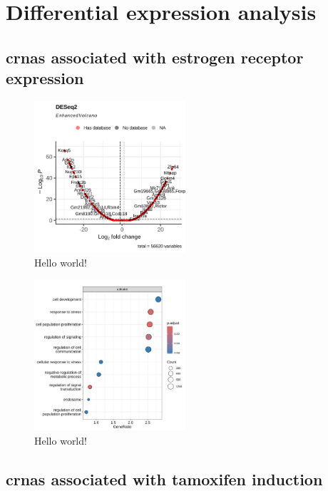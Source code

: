 \section{Differential expression analysis}

\subsection{\Glspl{crna} associated with estrogen receptor expression}

\begin{figure}[H]
    \centering

    \includegraphics[width=0.5\textwidth]{chapters/4_results_and_discussion/figures/dea/deseq2/esr1/volcano.png}
    \caption{Hello world!
    }
    \label{fig:esr1_volcano}
\end{figure}

\begin{figure}[H]
    \centering

    \includegraphics[width=0.5\textwidth]{chapters/4_results_and_discussion/figures/dea/deseq2/esr1/dot.png}
    \caption{Hello world!
    }
    \label{fig:go_terms}
\end{figure}

\subsection{\Glspl{crna} associated with tamoxifen induction}

